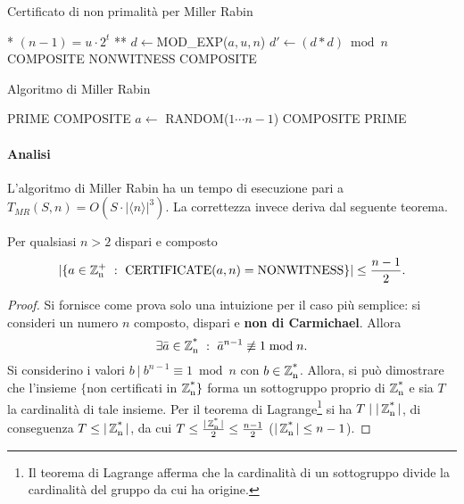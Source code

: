 \begin{algorithm}
\caption{Certificato di non primalità per Miller Rabin}
\label{alg:certificate}
\begin{algorithmic}
	\State ** $(n-1)=u\cdot 2^t$ **
	\State $d \gets $MOD\_EXP($a,u,n$)
		\State $d' \gets (d*d)\bmod n$
				\State \Return COMPOSITE
			\Else
				\State \Return NONWITNESS
			\EndIf
		\EndIf
	\EndFor
	\State \Return COMPOSITE
\EndFunction
\end{algorithmic}
\end{algorithm}

\begin{algorithm}
\caption{Algoritmo di Miller Rabin}
\label{alg:millerrabin}
\begin{algorithmic}
		\State \Return PRIME
	\EndIf
		\State \Return COMPOSITE
	\EndIf
		\State $a \gets $ RANDOM($1 \cdots n-1$)
			\State \Return COMPOSITE
		\EndIf
	\EndFor
	\State \Return PRIME
\EndFunction
\end{algorithmic}
\end{algorithm}

\paragraph{Analisi} L'algoritmo di Miller Rabin ha un tempo di esecuzione pari a $T_{MR}(S,n)=O(S\cdot |\langle n \rangle|^3)$. La correttezza invece deriva dal seguente teorema.
\begin{teorema}
Per qualsiasi $n>2$ dispari e composto
\[
|\{a\in\Znp\ :\ \text{CERTIFICATE}(a,n)=\text{NONWITNESS}\}| \leq \frac{n-1}{2}.
\]
\end{teorema}
\begin{proof}
Si fornisce come prova solo una intuizione per il caso più semplice: si consideri un numero $n$ composto, dispari e \textbf{non di Carmichael}. Allora
\[
\exists \bar{a}\in\Zns\ :\ \bar{a}^{n-1}\not\equiv 1\bmod n.
\]
Si considerino i valori $b\ |\ b^{n-1} \equiv 1\bmod n$ con $b\in\operatorname*{\mathbb{Z}_n^*}$. Allora, si può dimostrare che l'insieme $\{$non certificati in $\operatorname*{\mathbb{Z}_n^*}\}$ forma un sottogruppo proprio di $\operatorname*{\mathbb{Z}_n^*}$ e sia $T$ la cardinalità di tale insieme. Per il teorema di Lagrange\footnote{Il teorema di Lagrange afferma che la cardinalità di un sottogruppo divide la cardinalità del gruppo da cui ha origine.} si ha $T \mid |\operatorname*{\mathbb{Z}_n^*}|$, di conseguenza $T\leq|\operatorname*{\mathbb{Z}_n^*}|$, da cui $T \leq \frac{|\operatorname*{\mathbb{Z}_n^*}|}{2} \leq \frac{n-1}{2}$ ($|\operatorname*{\mathbb{Z}_n^*}|\leq n-1$).
\end{proof}

